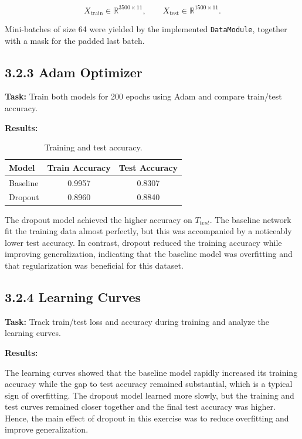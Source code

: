 \documentclass{article}
\begin{document}
\[
X_{\text{train}} \in \mathbb{R}^{3500 \times 11}, \qquad X_{\text{test}} \in \mathbb{R}^{1500 \times 11}.
\]

Mini-batches of size 64 were yielded by the implemented \texttt{DataModule}, together with a mask for the padded last batch.


\subsection*{3.2.3 Adam Optimizer}

\textbf{Task:} Train both models for 200 epochs using Adam and compare train/test accuracy.

\vspace{0.3cm}

\textbf{Results:}

\begin{table}[H]
\centering
\caption{Training and test accuracy.}
\begin{tabular}{lcc}
\toprule
Model & Train Accuracy & Test Accuracy \\
\midrule
Baseline & 0.9957 & 0.8307 \\
Dropout & 0.8960 & 0.8840 \\
\bottomrule
\end{tabular}
\end{table}

The dropout model achieved the higher accuracy on \(T_{test}\). The baseline network fit the training data almost perfectly, but this was accompanied by a noticeably lower test accuracy. In contrast, dropout reduced the training accuracy while improving generalization, indicating that the baseline model was overfitting and that regularization was beneficial for this dataset.


\subsection*{3.2.4 Learning Curves}

\textbf{Task:} Track train/test loss and accuracy during training and analyze the learning curves.

\vspace{0.3cm}

\textbf{Results:}

The learning curves showed that the baseline model rapidly increased its training accuracy while the gap to test accuracy remained substantial, which is a typical sign of overfitting. The dropout model learned more slowly, but the training and test curves remained closer together and the final test accuracy was higher. Hence, the main effect of dropout in this exercise was to reduce overfitting and improve generalization.
\end{document}
